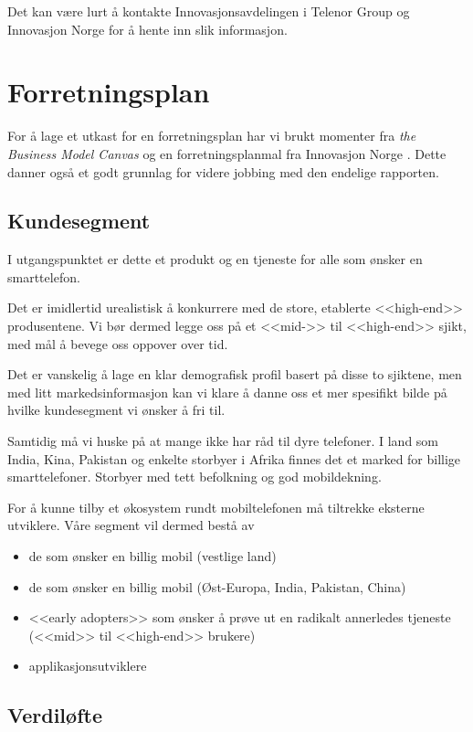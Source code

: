 Det kan være lurt å kontakte Innovasjonsavdelingen i Telenor Group og
Innovasjon Norge for å hente inn slik informasjon.

\section{Forretningsplan}

For å lage et utkast for en forretningsplan har vi brukt momenter fra
\textit{the Business Model Canvas} \cite{osterwalder} og en forretningsplanmal
fra Innovasjon Norge \cite{innovasjon.norge}. Dette danner også et godt
grunnlag for videre jobbing med den endelige rapporten.

\subsection{Kundesegment}

I utgangspunktet er dette et produkt og en tjeneste for alle som ønsker en
smarttelefon.

Det er imidlertid urealistisk å konkurrere med de store, etablerte <<high-end>>
produsentene.  Vi bør dermed legge oss på et <<mid->> til <<high-end>> sjikt,
med mål å bevege oss oppover over tid.

Det er vanskelig å lage en klar demografisk profil basert på disse to
sjiktene, men med litt markedsinformasjon kan vi klare å danne oss et mer
spesifikt bilde på hvilke kundesegment vi ønsker å fri til.

Samtidig må vi huske på at mange ikke har råd til dyre telefoner. I land som
India, Kina, Pakistan og enkelte storbyer i Afrika finnes det et marked for
billige smarttelefoner. Storbyer med tett befolkning og god mobildekning.

For å kunne tilby et økosystem rundt mobiltelefonen må tiltrekke eksterne
utviklere.  Våre segment vil dermed bestå av
%
\begin{itemize}
  \item de som ønsker en billig mobil (vestlige land)
  \item de som ønsker en billig mobil (Øst-Europa, India, Pakistan, China)
  \item <<early adopters>> som ønsker å prøve ut en radikalt annerledes
    tjeneste (<<mid>> til <<high-end>> brukere)
  \item applikasjonsutviklere
\end{itemize}

\subsection{Verdiløfte}

